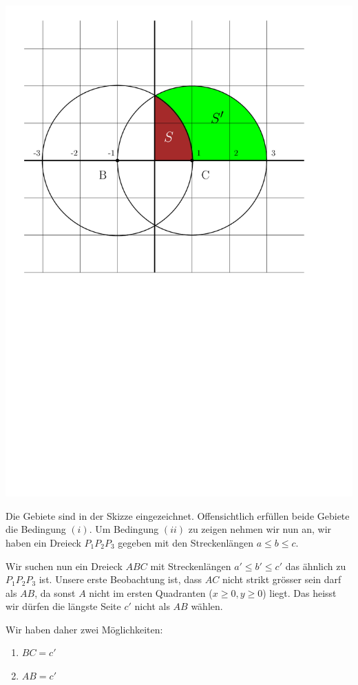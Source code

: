 \documentclass[language=german,style=solution]{smo}
\begin{document}
\begin{enumerate}
\begin{itemize}
\begin{center}\includegraphics[scale=0.7]{2017_11}\end{center}

Die Gebiete sind in der Skizze eingezeichnet. Offensichtlich erfüllen beide Gebiete die Bedingung $(i)$. Um Bedingung $(ii)$ zu zeigen nehmen wir nun an, wir haben ein Dreieck $P_1P_2P_3$ gegeben mit den Streckenlängen $a\leq b \leq c$.

Wir suchen nun ein Dreieck $ABC$ mit Streckenlängen $a' \leq b' \leq c'$ das ähnlich zu $P_1P_2P_3$ ist. Unsere erste Beobachtung ist, dass $AC$ nicht strikt grösser sein darf als $AB$, da sonst $A$ nicht im ersten Quadranten ($x\geq 0, y \geq 0$) liegt. Das heisst wir dürfen die längste Seite $c'$ nicht als $AB$ wählen.

Wir haben daher zwei Möglichkeiten:

\begin{enumerate}[1.]
\item $BC = c'$
\item $AB = c'$
\end{enumerate}


\end{itemize}
\end{enumerate}
\end{document}
